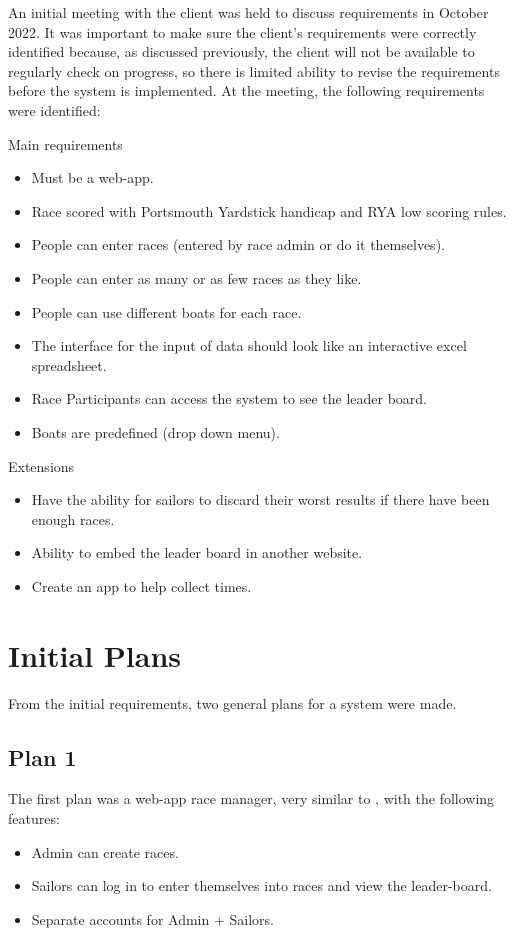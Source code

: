 \documentclass{l4proj}
\begin{document}
An initial meeting with the client was held to discuss requirements in October 2022. It was important to make sure the client’s requirements were correctly identified because, as discussed previously, the client will not be available to regularly check on progress, so there is limited ability to revise the requirements before the system is implemented.  At the meeting, the following requirements were identified:

Main requirements
\begin{itemize}
    \item
    Must be a web-app.
    \item
    Race scored with Portsmouth Yardstick handicap and RYA low scoring rules.
    \item
    People can enter races (entered by race admin or do it themselves).
    \item
    People can enter as many or as few races as they like.
    \item
    People can use different boats for each race.
    \item
    The interface for the input of data should look like an interactive excel spreadsheet.
    \item
    Race Participants can access the system to see the leader board.
    \item
    Boats are predefined (drop down menu).
\end{itemize}
Extensions
\begin{itemize}
    \item
    Have the ability for sailors to discard their worst results if there have been enough races.
    \item
    Ability to embed  the leader board in another website.
    \item
    Create an app to help collect times.
\end{itemize}

\section{Initial Plans}
From the initial requirements, two general plans for a system were made.
\subsection{Plan 1}
The first plan was a web-app race manager, very similar to \citet{SailEvent}, with the following features:
\begin{itemize}
    \item
    Admin can create races.
    \item
    Sailors can log in to enter themselves into races and view the leader-board.
    \item
    Separate accounts for Admin + Sailors.
\end{itemize}
\end{document}
